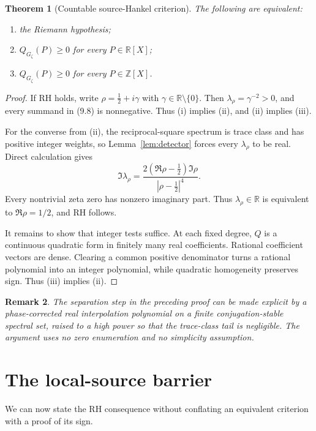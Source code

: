 \documentclass[11pt]{article}
\newtheorem{theorem}{Theorem}[section]
\newtheorem{remark}[theorem]{Remark}
\newcommand{\R}{\mathbb R}
\begin{document}
\begin{theorem}[Countable source-Hankel criterion]\label{thm:hankelRH}
The following are equivalent:
\begin{enumerate}[label=\textup{(\roman*)}]
\item the Riemann hypothesis;
\item \(Q_{G_\zeta}(P)\geq0\) for every \(P\in\R[X]\);
\item \(Q_{G_\zeta}(P)\geq0\) for every \(P\in\mathbb Z[X]\).
\end{enumerate}
\end{theorem}

\begin{proof}
If RH holds, write \(\rho=\frac12+i\gamma\) with \(\gamma\in\R\setminus\{0\}\).
Then \(\lambda_\rho=\gamma^{-2}>0\), and every summand in (9.8) is
nonnegative.  Thus (i) implies (ii), and (ii) implies (iii).

For the converse from (ii), the reciprocal-square spectrum is trace class and has
positive integer weights, so Lemma~\ref{lem:detector} forces every
\(\lambda_\rho\) to be real.
Direct calculation gives
\[
 \Im\lambda_\rho
 =\frac{2(\Re\rho-\frac12)\Im\rho}
        {|\rho-\frac12|^4}.
\tag{9.18}
\]
Every nontrivial zeta zero has nonzero imaginary part.  Thus
\(\lambda_\rho\in\R\) is equivalent to \(\Re\rho=1/2\), and RH follows.

It remains to show that integer tests suffice.  At each fixed degree, \(Q\) is a
continuous quadratic form in finitely many real coefficients.  Rational coefficient
vectors are dense.  Clearing a common positive denominator turns a rational
polynomial into an integer polynomial, while quadratic homogeneity preserves sign.
Thus (iii) implies (ii).
\end{proof}

\begin{remark}
The separation step in the preceding proof can be made explicit by a phase-corrected
real interpolation polynomial on a finite conjugation-stable spectral set, raised to
a high power so that the trace-class tail is negligible.  The argument uses no zero
enumeration and no simplicity assumption.
\end{remark}

\section{The local-source barrier}

We can now state the RH consequence without conflating an equivalent criterion with
a proof of its sign.
\end{document}
